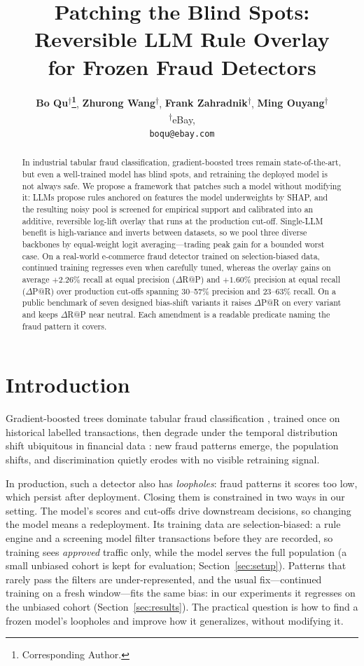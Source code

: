 \documentclass[11pt]{article}
\title{Patching the Blind Spots: Reversible LLM Rule Overlay\\
       for Frozen Fraud Detectors}
\author{%
     \textbf{Bo Qu\textsuperscript{\ensuremath{\dagger}}\thanks{Corresponding Author.}},
      \textbf{Zhurong Wang\textsuperscript{\ensuremath{\dagger}}},
    \textbf{Frank Zahradnik\textsuperscript{\ensuremath{\dagger}}},
     \textbf{Ming Ouyang\textsuperscript{\ensuremath{\dagger}}}
    \\
     \textsuperscript{\ensuremath{\dagger}}eBay,
     \\
\texttt{{boqu@ebay.com}}
  }
\begin{document}
\maketitle
\begin{abstract}
In industrial tabular fraud classification, gradient-boosted trees remain state-of-the-art, but even
a well-trained model has blind spots, and retraining the deployed model is not always safe. We
propose a framework that patches such a model without modifying it: LLMs propose rules
anchored on features the model underweights by SHAP, and the resulting noisy pool is screened for
empirical support and calibrated into an additive, reversible
log-lift overlay that runs at the production cut-off. Single-LLM benefit is high-variance and inverts between datasets, so we pool three
diverse backbones by equal-weight logit averaging---trading peak gain for a bounded worst case. On a
real-world e-commerce fraud detector trained on
selection-biased data, continued training regresses even when carefully tuned, whereas the overlay
gains on average $+2.26\%$ recall at equal precision ($\Delta$R@P) and $+1.60\%$ precision at equal
recall ($\Delta$P@R) over production cut-offs spanning 30--57\% precision and 23--63\% recall. On a
public benchmark of seven designed bias-shift variants it raises $\Delta$P@R on every variant and
keeps $\Delta$R@P near neutral. Each amendment is a readable predicate naming the fraud pattern it
covers.
\end{abstract}

\section{Introduction}
\label{sec:intro}

Gradient-boosted trees dominate tabular fraud classification
\citep{ke2017lightgbm,chen2016xgboost}, trained once on historical labelled transactions, then
degrade under the temporal distribution shift ubiquitous in financial data
\citep{quinonero2009shift,gama2014drift,dalpozzolo2018fraud}: new fraud patterns emerge, the
population shifts, and discrimination quietly erodes with no visible retraining signal.

In production, such a detector also has \emph{loopholes}: fraud patterns it scores too low, which
persist after deployment. Closing them is constrained in two ways in our setting. The model's scores
and cut-offs drive downstream decisions, so changing the model means a redeployment. Its training
data are selection-biased: a rule engine and a screening model filter transactions before they are
recorded, so training sees \emph{approved} traffic only, while the model serves the full population
(a small unbiased cohort is kept for evaluation; Section~\ref{sec:setup}). Patterns that rarely pass
the filters are under-represented, and the usual fix---continued training on a fresh window---fits
the same bias: in our experiments it regresses on the unbiased cohort (Section~\ref{sec:results}).
The practical question is how to find a frozen model's loopholes and improve how it generalizes,
without modifying it.
\end{document}
